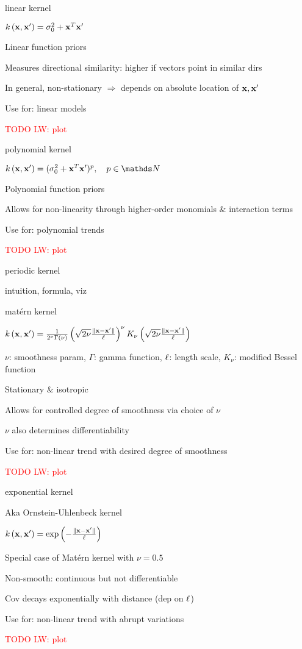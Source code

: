 \documentclass[11pt,compress,t,notes=noshow, xcolor=table]{beamer}
\begin{document}
\begin{framei}{linear kernel}
\item $k\left(\mathbf{x}, \mathbf{x}^{\prime} \right) = \sigma^2_0 + \mathbf{x}^T \mathbf{x}^\prime$
\item Linear function priors
\item Measures directional similarity: higher if vectors point in similar dirs
\item In general, non-stationary $\Rightarrow$ depends on absolute location of $\mathbf{x}, \mathbf{x}^\prime$
\item Use for: linear models
\item \textcolor{red}{TODO LW: plot}
\end{framei}

\begin{framei}{polynomial kernel}
\item $\kxxp = (\sigma^2_0 + \xv^T \xv^\prime )^p, \quad p \in \N$
\item Polynomial function priors
\item Allows for non-linearity through higher-order monomials \& interaction terms
\item Use for: polynomial trends
\item \textcolor{red}{TODO LW: plot}
\end{framei}

\begin{framei}[sep=L]{periodic kernel}
\item intuition, formula, viz
\end{framei}

\begin{framei}{matérn kernel}
\item $k\left(\mathbf{x}, \mathbf{x}^{\prime} \right) = \frac{1}{2^\nu \Gamma(\nu)} \left( \sqrt{2 \nu} \frac{\| \mathbf{x} - \mathbf{x}^\prime \|}{\ell} \right)^\nu K_\nu \left( \sqrt{2 \nu} \frac{\| \mathbf{x} - \mathbf{x}^\prime \|}{\ell} \right)$
\item $\nu$: smoothness param, $\Gamma$: gamma function, $\ell$: length scale, $K_\nu$: modified Bessel function
\item Stationary \& isotropic
\item Allows for controlled degree of smoothness via choice of $\nu$
\item $\nu$ also determines differentiability
\item Use for: non-linear trend with desired degree of smoothness
\item \textcolor{red}{TODO LW: plot}
\end{framei}

\begin{framei}{exponential kernel}
\item Aka Ornstein-Uhlenbeck kernel
\item $k\left(\mathbf{x}, \mathbf{x}^{\prime} \right) = \exp \left(-\frac{\| \mathbf{x} - \mathbf{x}^\prime \|}{\ell} \right)$
\item Special case of Matérn kernel with $\nu = 0.5$
\item Non-smooth: continuous but not differentiable
\item Cov decays exponentially with distance (dep on $\ell$)
\item Use for: non-linear trend with abrupt variations
\item \textcolor{red}{TODO LW: plot}
\end{framei}
\end{document}
